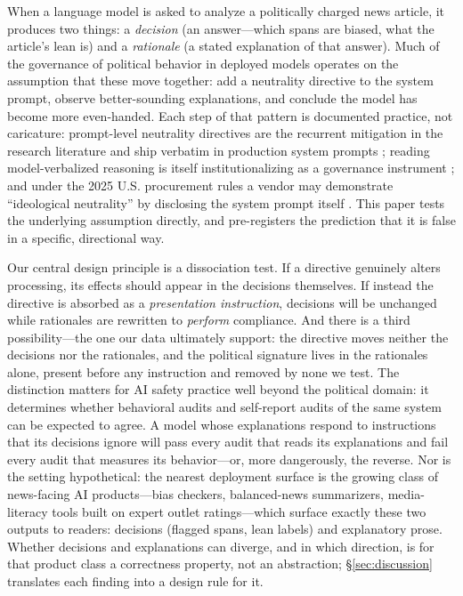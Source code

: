 \documentclass{article}
\begin{document}
When a language model is asked to analyze a politically charged news
article, it produces two things: a \emph{decision} (an answer---which spans
are biased, what the article's lean is) and a \emph{rationale} (a stated
explanation of that answer). Much of the governance of political behavior in
deployed models operates on the assumption that these move together: add a
neutrality directive to the system prompt, observe better-sounding
explanations, and conclude the model has become more even-handed. Each
step of that pattern is documented practice, not caricature: prompt-level
neutrality directives are the recurrent mitigation in the research
literature \citep{ganguli2023capacity,liu2025selfreflection,
yang2025rethinking,fisher2025neutrality} and ship verbatim in production
system prompts \citep{anthropic2025evenhandedness}; reading
model-verbalized reasoning is itself institutionalizing as a governance
instrument \citep{korbak2025monitorability,baker2025obfuscation}; and
under the 2025 U.S. procurement rules a vendor may demonstrate
``ideological neutrality'' by disclosing the system prompt itself
\citep{eo2025neutrality,omb2026m2604}. This paper
tests the underlying assumption directly, and pre-registers the
prediction that it is false in a specific, directional way.

Our central design principle is a dissociation test. If a directive
genuinely alters processing, its effects should appear in the decisions
themselves. If instead the directive is absorbed as a \emph{presentation
instruction}, decisions will be unchanged while rationales are rewritten to
\emph{perform} compliance. And there is a third possibility---the one
our data ultimately support: the directive moves neither the decisions
nor the rationales, and the political signature lives in the rationales
alone, present before any instruction and removed by none we
test. The distinction matters for AI safety practice
well beyond the political domain: it determines whether behavioral audits
and self-report audits of the same system can be expected to agree. A model
whose explanations respond to instructions that its decisions ignore will
pass every audit that reads its explanations and fail every audit that
measures its behavior---or, more dangerously, the reverse. Nor is the
setting hypothetical: the nearest deployment surface is the growing
class of news-facing AI products---bias checkers, balanced-news
summarizers, media-literacy tools built on expert outlet ratings---which
surface exactly these two outputs to readers: decisions (flagged spans,
lean labels) and explanatory prose. Whether decisions and explanations
can diverge, and in which direction, is for that product class a
correctness property, not an abstraction; \S\ref{sec:discussion} translates each
finding into a design rule for it.
\end{document}
